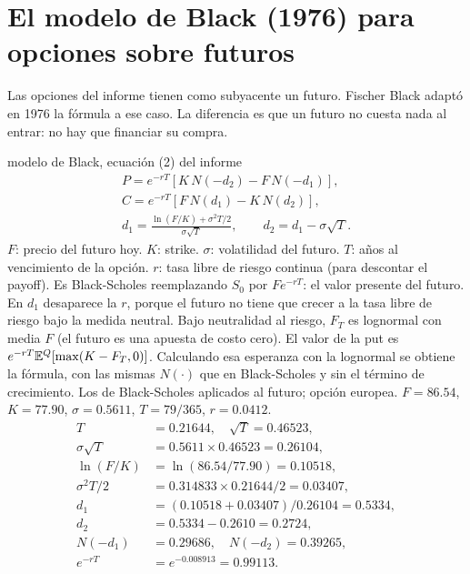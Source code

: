 \section{El modelo de Black (1976) para opciones sobre futuros}

Las opciones del informe tienen como subyacente un futuro. Fischer Black adaptó en 1976 la fórmula a ese caso. La diferencia es que un futuro no cuesta nada al entrar: no hay que financiar su compra.

\begin{ficha}{modelo de Black, ecuación (2) del informe}
\begin{gather*}
P=e^{-rT}\left[K\,N(-d_2)-F\,N(-d_1)\right],\\
C=e^{-rT}\left[F\,N(d_1)-K\,N(d_2)\right],\\
d_1=\frac{\ln(F/K)+\sigma^2T/2}{\sigma\sqrt T},\qquad d_2=d_1-\sigma\sqrt T.
\end{gather*}
 $F$: precio del futuro hoy. $K$: strike. $\sigma$: volatilidad del futuro. $T$: años al vencimiento de la opción. $r$: tasa libre de riesgo continua (para descontar el payoff).
 Es Black-Scholes reemplazando $S_0$ por $Fe^{-rT}$: el valor presente del futuro. En $d_1$ desaparece la $r$, porque el futuro no tiene que crecer a la tasa libre de riesgo bajo la medida neutral.
 Bajo neutralidad al riesgo, $F_T$ es lognormal con media $F$ (el futuro es una apuesta de costo cero). El valor de la put es $e^{-rT}\mathbb{E}^Q[\max(K-F_T,0)]$. Calculando esa esperanza con la lognormal se obtiene la fórmula, con las mismas $N(\cdot)$ que en Black-Scholes y sin el término de crecimiento.
 Los de Black-Scholes aplicados al futuro; opción europea.
 $F=86.54$, $K=77.90$, $\sigma=0.5611$, $T=79/365$, $r=0.0412$.
\begin{align*}
T&=0.21644,\quad \sqrt T=0.46523,\\
\sigma\sqrt T&=0.5611\times0.46523=0.26104,\\
\ln(F/K)&=\ln(86.54/77.90)=0.10518,\\
\sigma^2T/2&=0.314833\times0.21644/2=0.03407,\\
d_1&=(0.10518+0.03407)/0.26104=0.5334,\\
d_2&=0.5334-0.2610=0.2724,\\
N(-d_1)&=0.29686,\quad N(-d_2)=0.39265,\\
e^{-rT}&=e^{-0.008913}=0.99113.
\end{align*}

\end{ficha}
